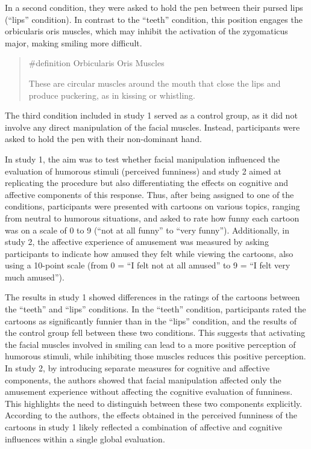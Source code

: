 \documentclass[
  letterpaper,
]{book}
\begin{document}
In a second condition, they were asked to hold the pen between their
pursed lips (``lips'' condition). In contrast to the ``teeth''
condition, this position engages the orbicularis oris muscles, which may
inhibit the activation of the zygomaticus major, making smiling more
difficult.

\begin{quote}
\label{def-orbicularisoris}{\#definition} Orbicularis
Oris Muscles

These are circular muscles around the mouth that close the lips and
produce puckering, as in kissing or whistling.
\end{quote}

The third condition included in study 1 served as a control group, as it
did not involve any direct manipulation of the facial muscles. Instead,
participants were asked to hold the pen with their non-dominant hand.

In study 1, the aim was to test whether facial manipulation influenced
the evaluation of humorous stimuli (perceived funniness) and study 2
aimed at replicating the procedure but also differentiating the effects
on cognitive and affective components of this response. Thus, after
being assigned to one of the conditions, participants were presented
with cartoons on various topics, ranging from neutral to humorous
situations, and asked to rate how funny each cartoon was on a scale of 0
to 9 (``not at all funny'' to ``very funny''). Additionally, in study 2,
the affective experience of amusement was measured by asking
participants to indicate how amused they felt while viewing the
cartoons, also using a 10-point scale (from 0 = ``I felt not at all
amused'' to 9 = ``I felt very much amused'').

The results in study 1 showed differences in the ratings of the cartoons
between the ``teeth'' and ``lips'' conditions. In the ``teeth''
condition, participants rated the cartoons as significantly funnier than
in the ``lips'' condition, and the results of the control group fell
between these two conditions. This suggests that activating the facial
muscles involved in smiling can lead to a more positive perception of
humorous stimuli, while inhibiting those muscles reduces this positive
perception. In study 2, by introducing separate measures for cognitive
and affective components, the authors showed that facial manipulation
affected only the amusement experience without affecting the cognitive
evaluation of funniness. This highlights the need to distinguish between
these two components explicitly. According to the authors, the effects
obtained in the perceived funniness of the cartoons in study 1 likely
reflected a combination of affective and cognitive influences within a
single global evaluation.
\end{document}
